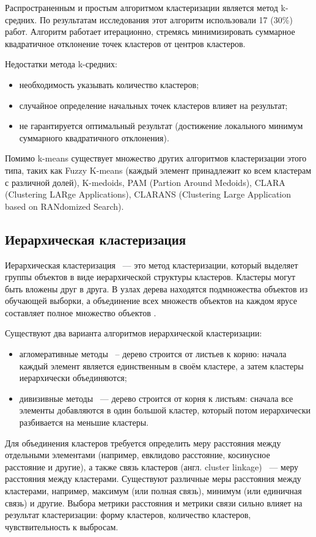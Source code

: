 Распространенным и простым алгоритмом кластеризации является метод k-средних. По результатам исследования \cite{no-patterns} этот алгоритм использовали 17 (30\%) работ.  Алгоритм работает итерационно, стремясь минимизировать суммарное квадратичное отклонение точек кластеров от центров кластеров.

Недостатки метода k-средних:
\begin{itemize}
    \item необходимость указывать количество кластеров;
    \item случайное определение начальных точек кластеров влияет на результат;
    \item не гарантируется оптимальный результат (достижение локального минимум суммарного квадратичного отклонения).
\end{itemize}

Помимо k-means существует множество других алгоритмов кластеризации этого типа, таких как Fuzzy K-means (каждый элемент принадлежит ко всем кластерам с различной долей), K-medoids, PAM (Partion Around Medoids), CLARA (Clustering LARge Applications), CLARANS (Clustering Large Application based on RANdomized Search).

\subsection{Иерархическая кластеризация}
Иерархическая кластеризация ~--- это метод кластеризации, который выделяет группы объектов в виде иерархической структуры кластеров. Кластеры могут быть вложены друг в друга. В узлах дерева находятся подмножества объектов из обучающей выборки, а объединение всех множеств объектов на каждом ярусе составляет полное множество объектов \cite{no-patterns, deep-clustering-survey}.

Существуют два варианта алгоритмов иерархической кластеризации:
\begin{itemize}
    \item агломеративные методы ~-- дерево строится от листьев к корню: начала каждый элемент является единственным в своём кластере, а затем кластеры иерархически объединяются;
    \item дивизивные методы ~--- дерево строится от корня к листьям: сначала все элементы добавляются в один большой кластер, который потом иерархически разбивается на меньшие кластеры.
\end{itemize}

Для объединения кластеров требуется определить меру расстояния между отдельными элементами (например, евклидово расстояние, косинусное расстояние и другие), а также связь кластеров (англ. cluster linkage) ~--- меру расстояния между кластерами. Существуют различные  меры расстояния между кластерами, например, максимум (или полная связь), минимум (или единичная связь) и другие. Выбора метрики расстояния и метрики связи сильно влияет на результат кластеризации: форму кластеров, количество кластеров, чувствительность к выбросам.

